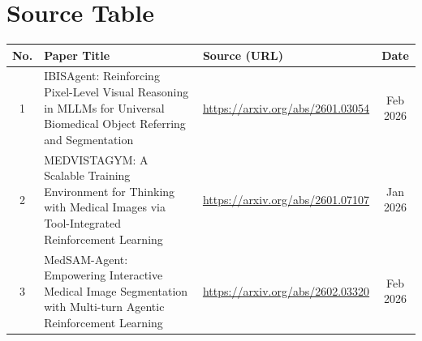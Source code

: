 \documentclass[12pt, a4paper]{article}
\begin{document}
\newpage\thispagestyle{empty}
\tableofcontents
\vspace{1cm}

\section*{Source Table}
\begin{table}[H]
\centering\renewcommand{\arraystretch}{1.4}\small
\begin{tabular}{|c|p{7.5cm}|p{3.5cm}|c|}
\hline
\textbf{No.} & \textbf{Paper Title} & \textbf{Source (URL)} & \textbf{Date} \\
\hline\hline
1 & IBISAgent: Reinforcing Pixel-Level Visual Reasoning in MLLMs for Universal Biomedical Object Referring and Segmentation & \url{https://arxiv.org/abs/2601.03054} & Feb 2026 \\
\hline
2 & MEDVISTAGYM: A Scalable Training Environment for Thinking with Medical Images via Tool-Integrated Reinforcement Learning & \url{https://arxiv.org/abs/2601.07107} & Jan 2026 \\
\hline
3 & MedSAM-Agent: Empowering Interactive Medical Image Segmentation with Multi-turn Agentic Reinforcement Learning & \url{https://arxiv.org/abs/2602.03320} & Feb 2026 \\
\hline
\end{tabular}
\end{table}
\newpage

\begin{abstract}
\noindent
The use of reinforcement learning with language models that can handle many types of data
has opened up a new way for computers to analyze medical images on their own.
Recently three systems---IBISAgent~\cite{ibisagent}, MedVistaGym and
MedVista-R1~\cite{medvistagym}, and MedSAMAgent~\cite{medsam_agent}---have
shown how computers can be trained to look at images in detail and make
clinical decisions without human help.
This review compares how these three systems work.
We look at how they are designed, how they are trained, and how they make decisions.
We also examine what they have in common and what makes them different.
These systems use a process to make decisions. They are fine-tuned in two stages before
being trained with reinforcement learning.
We find that there are still some challenges to overcome such as making these systems
faster and able to handle complex data.
We also need to find ways to give these systems information about the process
and make them better at handling new situations.
The review ends with some ideas for improvements and a look at what the next
generation of medical AI systems might be like.

\vspace{6pt}
\noindent\textbf{Keywords:} Medical Image Segmentation, Multimodal Large Language
Models, Reinforcement Learning, Agentic AI, Segment Anything Model, Interactive
Segmentation, Markov Decision Process, Tool-Integrated Reasoning.
\end{abstract}
\end{document}

